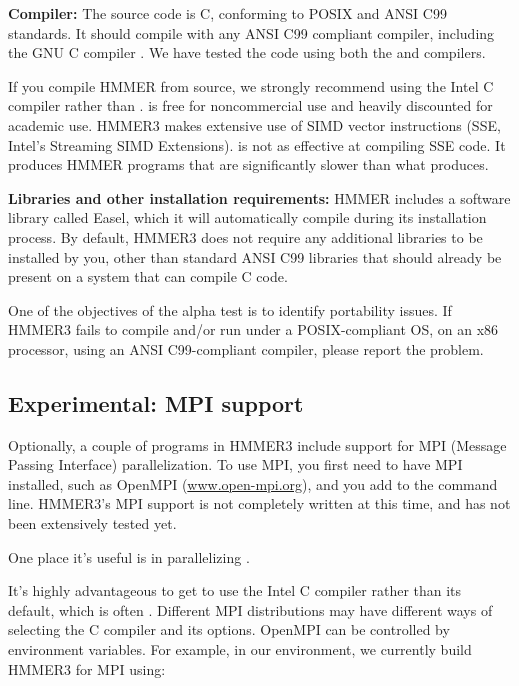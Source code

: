 \textbf{Compiler:} The source code is C, conforming to POSIX and ANSI
C99 standards. It should compile with any ANSI C99 compliant compiler,
including the GNU C compiler .  We have tested the code
using both the  and  compilers.

If you compile HMMER from source, we strongly recommend using the
Intel C compiler  rather than .  is free
for noncommercial use and heavily discounted for academic use.  HMMER3
makes extensive use of SIMD vector instructions (SSE, Intel's
Streaming SIMD Extensions).  is not as effective at
compiling SSE code. It produces HMMER programs that are significantly
slower than what  produces.

\textbf{Libraries and other installation requirements:} HMMER includes
a software library called Easel, which it will automatically compile
during its installation process.  By default, HMMER3 does not require
any additional libraries to be installed by you, other than standard
ANSI C99 libraries that should already be present on a system that can
compile C code.

\begin{sidebar}
One of the objectives of the alpha test is to identify portability
issues. If HMMER3 fails to compile and/or run under a POSIX-compliant
OS, on an x86 processor, using an ANSI C99-compliant compiler, please
report the problem.
\end{sidebar}



\subsection{Experimental: MPI support}

Optionally, a couple of programs in HMMER3 include support for MPI
(Message Passing Interface) parallelization. To use MPI, you first
need to have MPI installed, such as OpenMPI (\url{www.open-mpi.org}),
and you add  to the  command
line. HMMER3's MPI support is not completely written at this time, and
has not been extensively tested yet. 

One place it's useful is in parallelizing .

It's highly advantageous to get  to use the Intel C
compiler rather than its default, which is often . Different
MPI distributions may have different ways of selecting the C compiler
and its options. OpenMPI can be controlled by environment variables.
For example, in our environment, we currently build HMMER3 for MPI
using:

